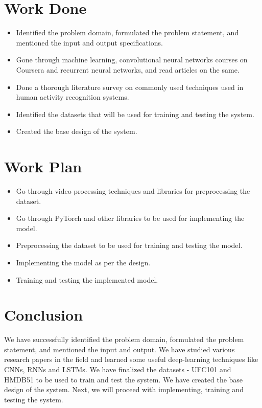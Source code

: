 \documentclass[twocolumn]{article}
\begin{document}
\section{Work Done}
\begin{itemize}
    \item Identified the problem domain, formulated the problem statement, and mentioned the input and output specifications.
    \item Gone through machine learning, convolutional neural networks courses on Coursera and recurrent neural networks, and read articles on the same.
    \item Done a thorough literature survey on commonly used techniques used in human activity recognition systems.
    \item Identified the datasets that will be used for training and testing the system.
    \item Created the base design of the system.
\end{itemize}

\section{Work Plan}
\begin{itemize}
    \item Go through video processing techniques and libraries for preprocessing the dataset.
    \item Go through PyTorch and other libraries to be used for implementing the model.
    \item Preprocessing the dataset to be used for training and testing the model.
    \item Implementing the model as per the design.
    \item Training and testing the implemented model.
\end{itemize}

\section{Conclusion}
We have successfully identified the problem domain, formulated the problem statement, and mentioned the input and output. We have studied various research papers in the field and learned some useful deep-learning techniques like CNNs, RNNs and LSTMs. We have finalized the datasets - UFC101 and HMDB51 to be used to train and test the system. We have created the base design of the system. Next, we will proceed with implementing, training and testing the system.
\end{document}
